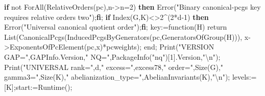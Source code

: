 \documentclass[
  10pt,
  letterpaper,
]{article}
\newenvironment{Shaded}{}{}
\newcommand{\BuiltInTok}[1]{\textcolor[rgb]{0.00,0.50,0.00}{#1}}
\newcommand{\ConstantTok}[1]{\textcolor[rgb]{0.53,0.00,0.00}{#1}}
\newcommand{\ControlFlowTok}[1]{\textcolor[rgb]{0.00,0.44,0.13}{\textbf{#1}}}
\newcommand{\ExtensionTok}[1]{#1}
\newcommand{\FloatTok}[1]{\textcolor[rgb]{0.25,0.63,0.44}{#1}}
\newcommand{\FunctionTok}[1]{\textcolor[rgb]{0.02,0.16,0.49}{#1}}
\newcommand{\NormalTok}[1]{#1}
\newcommand{\OperatorTok}[1]{\textcolor[rgb]{0.40,0.40,0.40}{#1}}
\newcommand{\StringTok}[1]{\textcolor[rgb]{0.25,0.44,0.63}{#1}}
\newcommand{\VariableTok}[1]{\textcolor[rgb]{0.10,0.09,0.49}{#1}}
\begin{document}
\begin{Shaded}
\begin{Highlighting}[]
 \ControlFlowTok{if} \ConstantTok{not} \BuiltInTok{ForAll}\NormalTok{(}\BuiltInTok{RelativeOrders}\NormalTok{(}\VariableTok{pc}\NormalTok{)}\OperatorTok{,}\VariableTok{n}\OperatorTok{{-}\textgreater{}}\VariableTok{n}\OperatorTok{=}\FloatTok{2}\NormalTok{) }\ControlFlowTok{then} \BuiltInTok{Error}\NormalTok{(}\StringTok{"Binary canonical{-}pcgs key requires relative orders two"}\NormalTok{)}\OperatorTok{;}\ControlFlowTok{fi}\OperatorTok{;}
 \ControlFlowTok{if} \BuiltInTok{Index}\NormalTok{(}\VariableTok{G}\OperatorTok{,}\VariableTok{K}\NormalTok{)}\OperatorTok{\textless{}\textgreater{}}\FloatTok{2}\OperatorTok{\^{}}\NormalTok{(}\FloatTok{2}\OperatorTok{*}\VariableTok{d}\OperatorTok{{-}}\FloatTok{1}\NormalTok{) }\ControlFlowTok{then} \BuiltInTok{Error}\NormalTok{(}\StringTok{"Universal canonical quotient order"}\NormalTok{)}\OperatorTok{;}\ControlFlowTok{fi}\OperatorTok{;}
 \VariableTok{key}\OperatorTok{:=}\FunctionTok{function}\NormalTok{(}\VariableTok{H}\NormalTok{)}
  \ExtensionTok{return} \BuiltInTok{List}\NormalTok{(}\BuiltInTok{CanonicalPcgs}\NormalTok{(}\BuiltInTok{InducedPcgsByGenerators}\NormalTok{(}\VariableTok{pc}\OperatorTok{,}\BuiltInTok{GeneratorsOfGroup}\NormalTok{(}\VariableTok{H}\NormalTok{)))}\OperatorTok{,}
   \VariableTok{x}\OperatorTok{{-}\textgreater{}}\BuiltInTok{ExponentsOfPcElement}\NormalTok{(}\VariableTok{pc}\OperatorTok{,}\VariableTok{x}\NormalTok{)}\OperatorTok{*}\VariableTok{pcweights}\NormalTok{)}\OperatorTok{;}
 \FunctionTok{end}\OperatorTok{;}
 \BuiltInTok{Print}\NormalTok{(}\StringTok{"VERSION GAP="}\OperatorTok{,}\BuiltInTok{GAPInfo}\NormalTok{.}\VariableTok{Version}\OperatorTok{,}\StringTok{" NQ="}\OperatorTok{,}\BuiltInTok{PackageInfo}\NormalTok{(}\StringTok{"nq"}\NormalTok{)[}\FloatTok{1}\NormalTok{].}\VariableTok{Version}\OperatorTok{,}\StringTok{"\textbackslash{}n"}\NormalTok{)}\OperatorTok{;}
 \BuiltInTok{Print}\NormalTok{(}\StringTok{"UNIVERSAL rank="}\OperatorTok{,}\VariableTok{d}\OperatorTok{,}\StringTok{" excess="}\OperatorTok{,}\VariableTok{excess78}\OperatorTok{,}\StringTok{" order="}\OperatorTok{,}\BuiltInTok{Size}\NormalTok{(}\VariableTok{G}\NormalTok{)}\OperatorTok{,}\StringTok{" gamma3="}\OperatorTok{,}\BuiltInTok{Size}\NormalTok{(}\VariableTok{K}\NormalTok{)}\OperatorTok{,}\StringTok{" abelianization\_type="}\OperatorTok{,}\BuiltInTok{AbelianInvariants}\NormalTok{(}\VariableTok{K}\NormalTok{)}\OperatorTok{,}\StringTok{"\textbackslash{}n"}\NormalTok{)}\OperatorTok{;}
 \VariableTok{levels}\OperatorTok{:=}\NormalTok{[}\VariableTok{K}\NormalTok{]}\OperatorTok{;}\VariableTok{start}\OperatorTok{:=}\BuiltInTok{Runtime}\NormalTok{()}\OperatorTok{;}

\end{Highlighting}
\end{Shaded}
\end{document}
